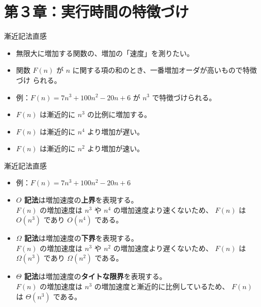\documentclass[unicode,11pt,aspectratio=169,notes]{beamer} %
\begin{document}
\section*{第３章：実行時間の特徴づけ}

\begin{frame}
  \sectionpage
\end{frame}

\begin{frame}{漸近記法}{直感}
  \begin{itemize}
    \item 無限大に増加する関数の、増加の「速度」を測りたい。
    \item 関数 $F(n)$ が $n$ に関する項の和のとき、一番増加オーダが高いもので特徴づけ
    られる。
    \item 例：$F(n) = 7n^3 + 100n^2 - 20n + 6$ が $n^3$ で特徴づけられる。
    \item $F(n)$ は漸近的に $n^3$ の比例に増加する。
    \item $F(n)$ は漸近的に $n^4$ より増加が遅い。
    \item $F(n)$ は漸近的に $n^2$ より増加が速い。
  \end{itemize}
\end{frame}

\begin{frame}{漸近記法}{直感}
  \begin{itemize}
    \item 例：$F(n) = 7n^3 + 100n^2 - 20n + 6$
    \item \textbf{$O$ 記法}は増加速度の\textbf{上界}を表現する。\\
    $F(n)$ の増加速度は $n^3$ や $n^4$ の増加速度より速くないため、
    $F(n)$ は $O(n^3)$ であり $O(n^4)$ である。
    \item \textbf{$\Omega$ 記法}は増加速度の\textbf{下界}を表現する。\\
    $F(n)$ の増加速度は $n^3$ や $n^2$ の増加速度より遅くないため、
    $F(n)$ は $\Omega(n^3)$ であり $\Omega(n^2)$ である。
    \item \textbf{$\Theta$ 記法}は増加速度の\textbf{タイトな限界}を表現する。\\
    $F(n)$ の増加速度は $n^3$ の増加速度と漸近的に比例しているため、
    $F(n)$ は $\Theta(n^3)$ である。
  \end{itemize}
\end{frame}
\end{document}

